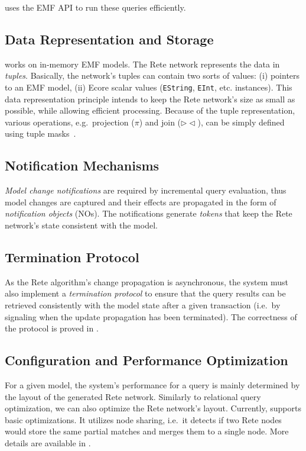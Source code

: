 \eiq{} uses the EMF API to run these queries efficiently.

\subsection{Data Representation and Storage}

\eiq{} works on in-memory EMF models. The Rete network represents the data in \emph{tuples}. Basically, the network's tuples can contain two sorts of values: (i) pointers to an EMF model, (ii) Ecore scalar values (\verb+EString+, \verb+EInt+, etc. instances). This data representation principle intends to keep the Rete network's size as small as possible, while allowing efficient processing. Because of the tuple representation, various operations, e.g.\ projection ($ \pi $) and join ($ \rhd\!\!\lhd $), can be simply defined using tuple masks~\cite{BergmannMasters}.

\subsection{Notification Mechanisms}
\label{notifications}

\emph{Model change notifications} are required by incremental query evaluation, thus model changes are captured and their effects are propagated in the form of \emph{notification objects} (NOs). The notifications generate \emph{tokens} that keep the Rete network's state consistent with the model. 

\subsection{Termination Protocol}

As the Rete algorithm's change propagation is asynchronous, the system must also implement a \emph{termination protocol} to ensure that the query results can be retrieved consistently with the model state after a given transaction (i.e.\ by signaling when the update propagation has been terminated). The correctness of the protocol is proved in \cite{BergmannMasters}.

\subsection{Configuration and Performance Optimization}

For a given model, the system's performance for a query is mainly determined by the layout of the generated Rete network. Similarly to relational query optimization, we can also optimize the Rete network's layout. Currently, \eiq{} supports basic optimizations. It utilizes node sharing, i.e.\ it detects if two Rete nodes would store the same partial matches and merges them to a single node. More details are available in \cite{BergmannPhD}.

